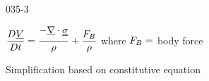 \begin{mitframe}{035-3}

\begin{listone}
		\item $\dfrac{\elecdisplace\uline{\vol}}{\elecdisplace{t}}=\dfrac{-\gradop\cdot\stresstens}{\dens}+\dfrac{\force_{\exergy}}{\dens}$ where $\force_{\exergy}=$ body force
			\begin{listtwo}
          	  \item Simplification based on constitutive equation
			\end{listtwo}
\end{listone}
\end{mitframe}